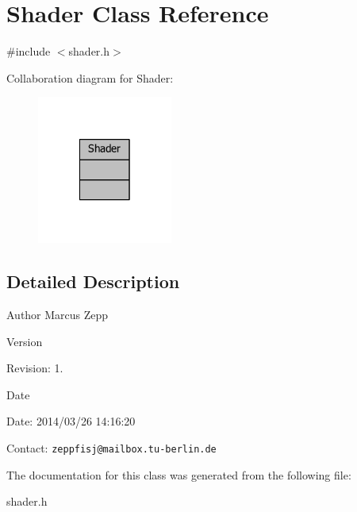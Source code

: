 \section{Shader Class Reference}
\label{classShader}


{\ttfamily \#include $<$shader.\-h$>$}



Collaboration diagram for Shader\-:
\nopagebreak
\begin{figure}[H]
\begin{center}
\leavevmode
\includegraphics[width=126pt]{d9/dba/classShader__coll__graph}
\end{center}
\end{figure}


\subsection{Detailed Description}
\begin{DoxyAuthor}{Author}
Marcus Zepp
\end{DoxyAuthor}
\begin{DoxyVersion}{Version}

\end{DoxyVersion}
\begin{DoxyParagraph}{Revision\-:}
1. 
\end{DoxyParagraph}


\begin{DoxyDate}{Date}

\end{DoxyDate}
\begin{DoxyParagraph}{Date\-:}
2014/03/26 14\-:16\-:20 
\end{DoxyParagraph}


Contact\-: {\tt zeppfisj@mailbox.\-tu-\/berlin.\-de} 

The documentation for this class was generated from the following file\-:\begin{DoxyCompactItemize}
\item 
shader.\-h\end{DoxyCompactItemize}
